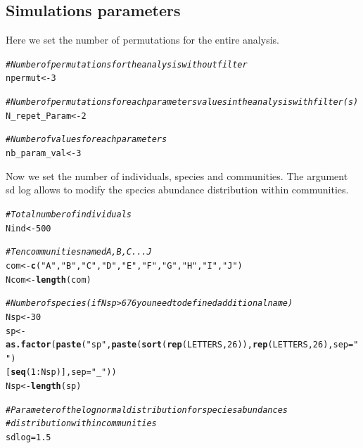 \documentclass[12pt]{article}\usepackage[]{graphicx}\usepackage[]{color}
\makeatletter
\newcommand{\hlnum}[1]{\textcolor[rgb]{0.686,0.059,0.569}{#1}}%
\newcommand{\hlstr}[1]{\textcolor[rgb]{0.192,0.494,0.8}{#1}}%
\newcommand{\hlcom}[1]{\textcolor[rgb]{0.678,0.584,0.686}{\textit{#1}}}%
\newcommand{\hlopt}[1]{\textcolor[rgb]{0,0,0}{#1}}%
\newcommand{\hlstd}[1]{\textcolor[rgb]{0.345,0.345,0.345}{#1}}%
\newcommand{\hlkwb}[1]{\textcolor[rgb]{0.69,0.353,0.396}{#1}}%
\newcommand{\hlkwc}[1]{\textcolor[rgb]{0.333,0.667,0.333}{#1}}%
\newcommand{\hlkwd}[1]{\textcolor[rgb]{0.737,0.353,0.396}{\textbf{#1}}}%
\newenvironment{kframe}{%
 \def\at@end@of@kframe{}%
 \ifinner\ifhmode%
  \def\at@end@of@kframe{\end{minipage}}%
  \begin{minipage}{\columnwidth}%
 \fi\fi%
 \def\FrameCommand##1{\hskip\@totalleftmargin \hskip-\fboxsep
 \colorbox{shadecolor}{##1}\hskip-\fboxsep
     \hskip-\linewidth \hskip-\@totalleftmargin \hskip\columnwidth}%
 \MakeFramed {\advance\hsize-\width
   \@totalleftmargin\z@ \linewidth\hsize
   \@setminipage}}%
 {\par\unskip\endMakeFramed%
 \at@end@of@kframe}
\newenvironment{knitrout}{}{} %
\makeatother
\begin{document}
  
  
  
  
  
  
  \subsection{Simulations parameters}

Here we set the number of permutations for the entire analysis. 

\begin{knitrout}\small
{}\color{fgcolor}\begin{kframe}
\begin{alltt}
\hlcom{#Number of permutations for the analysis without filter}
\hlstd{npermut} \hlkwb{<-} \hlnum{3}

\hlcom{#Number of permutations for each parameters values in the analysis with filter(s)}
\hlstd{N_repet_Param} \hlkwb{<-} \hlnum{2}

\hlcom{#Number of values for each parameters}
\hlstd{nb_param_val} \hlkwb{<-} \hlnum{3}
\end{alltt}
\end{kframe}
\end{knitrout}

Now we set the number of individuals, species and communities. 
The argument sd log allows to modify the species abundance distribution within communities.

\begin{knitrout}\small
{}\color{fgcolor}\begin{kframe}
\begin{alltt}
\hlcom{#Total number of individuals}
\hlstd{Nind} \hlkwb{<-} \hlnum{500}

\hlcom{#Ten communities named A, B, C ... J}
\hlstd{com} \hlkwb{<-} \hlkwd{c}\hlstd{(}\hlstr{"A"}\hlstd{,} \hlstr{"B"}\hlstd{,} \hlstr{"C"}\hlstd{,} \hlstr{"D"}\hlstd{,} \hlstr{"E"}\hlstd{,} \hlstr{"F"}\hlstd{,} \hlstr{"G"}\hlstd{,} \hlstr{"H"}\hlstd{,} \hlstr{"I"}\hlstd{,} \hlstr{"J"}\hlstd{)}
\hlstd{Ncom} \hlkwb{<-} \hlkwd{length}\hlstd{(com)}

\hlcom{#Number of species (if Nsp > 676 you need to defined additional name)}
\hlstd{Nsp} \hlkwb{<-} \hlnum{30}
\hlstd{sp} \hlkwb{<-} \hlkwd{as.factor}\hlstd{(}\hlkwd{paste}\hlstd{(}\hlstr{"sp"}\hlstd{,} \hlkwd{paste}\hlstd{(}\hlkwd{sort}\hlstd{(}\hlkwd{rep}\hlstd{(LETTERS,} \hlnum{26}\hlstd{)),} \hlkwd{rep}\hlstd{(LETTERS,} \hlnum{26}\hlstd{),}  \hlkwc{sep}\hlstd{=}\hlstr{""}\hlstd{)}
                     \hlstd{[}\hlkwd{seq}\hlstd{(}\hlnum{1}\hlopt{:}\hlstd{Nsp)],} \hlkwc{sep} \hlstd{=}\hlstr{"_"}\hlstd{))}
\hlstd{Nsp} \hlkwb{<-} \hlkwd{length}\hlstd{(sp)}

\hlcom{#Parameter of the log normal distribution for species abundances }
\hlcom{#distribution within communities}
\hlstd{sdlog} \hlkwb{=} \hlnum{1.5}
\end{alltt}
\end{kframe}
\end{knitrout}
\end{document}
